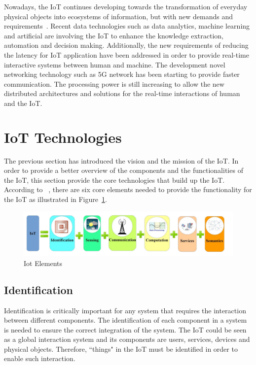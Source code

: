 Nowadays, the IoT continues developing towards the transformation of everyday physical objects into ecosystems of information, but with new demands and requirements~\citep{Vermesan:2018}.
Recent data technologies such as data analytics, machine learning and artificial are involving the IoT to enhance the knowledge extraction, automation and decision making. 
Additionally, the new requirements of reducing the latency for IoT application have been addressed in order to provide
real-time interactive systems between human and machine.
The development novel networking technology such as 5G network has been starting to provide faster communication.
The processing power is still increasing to allow the new distributed architectures and solutions for the real-time interactions of human and the IoT.  

\section{IoT Technologies}

The previous section has introduced the vision and the mission of the IoT. 
In order to provide a better overview of the components and the functionalities of the IoT, this section provide the core technologies that build up the IoT. 
According to ~\cite{Al-Fuqaha:2015}, there are six core elements needed to provide the functionality for the IoT as illustrated in Figure~\ref{fig:2.2-technologies}.

\begin{figure}
    \centering
    \includegraphics[scale=.30]{Pictures/c2/6-elements.png}
    \caption{Iot Elements~\citep{Al-Fuqaha:2015}}
    \label{fig:2.2-technologies}
\end{figure}


\subsection{Identification}
\label{ss:identification}

Identification is critically important for any system that requires the interaction between different components. 
The identification of each component in a system is needed to ensure the correct integration of the system.
The IoT could be seen as a global interaction system and its components are users, services, devices and physical objects.
Therefore, ``things" in the IoT must be identified in order to enable such interaction.

